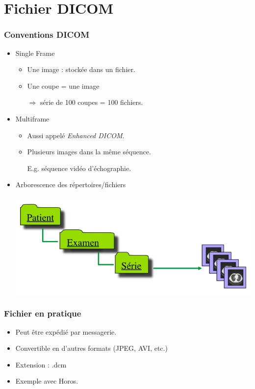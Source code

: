 \section{Fichier DICOM}

\frame
{
	\frametitle{Conventions DICOM}
	\begin{itemize}
		\item Single Frame
		\begin{itemize}
			\item Une image : stock\'ee dans un fichier.
			\item Une coupe = une image
		
			$\Rightarrow$ s\'erie de 100 coupes = 100 fichiers.
		\end{itemize}
		\item Multiframe
		\begin{itemize}
			\item Aussi appel\'e \emph{Enhanced DICOM}.
			\item Plusieurs images dans la m\^eme s\'equence.
			
			E.g. s\'equence vid\'eo d'\'echographie.
		\end{itemize}
		\item Arborescence des r\'epertoires/fichiers
		\begin{center}
			\includegraphics[width=.8\linewidth]{./figures/arborescence.png}
		\end{center}

	\end{itemize}
}

\frame
{
	\frametitle{Fichier en pratique}
	
	\begin{itemize}
		\item Peut \^etre exp\'edi\'e par messagerie.
		\item Convertible en d'autres formats (JPEG, AVI, etc.)
		\item Extension : .dcm
		\item Exemple avec Horos.
	\end{itemize}
}

